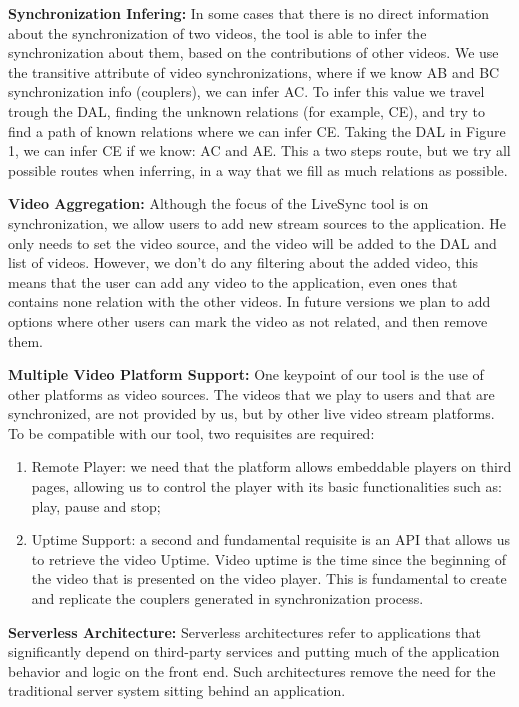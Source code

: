 \documentclass[sigconf]{acmart}
\begin{document}
\textbf{Synchronization Infering:} In some cases that there is no direct information about the synchronization of two videos, the tool is able to infer the synchronization about them, based on the contributions of other videos. We use the transitive attribute of video synchronizations, where if we know AB and BC synchronization info (couplers), we can infer AC. To infer this value we travel trough the DAL, finding the unknown relations (for example, CE), and try to find a path of known relations where we can infer CE. Taking the DAL in Figure 1, we can infer CE if we know: AC and AE. This a two steps route, but we try all possible routes when inferring, in a way that we fill as much relations as possible.

\textbf{Video Aggregation:} Although the focus of the LiveSync tool is on synchronization, we allow users to add new stream sources to the application. He only needs to set the video source, and the video will be added to the DAL and list of videos. However, we don't do any filtering about the added video, this means that the user can add any video to the application, even ones that contains none relation with the other videos. In future versions we plan to add options where other users can mark the video as not related, and then remove them.

\textbf{Multiple Video Platform Support:} One keypoint of our tool is the use of other platforms as video sources. The videos that we play to users and that are synchronized, are not provided by us, but by other live video stream platforms. To be compatible with our tool, two requisites are required:

\begin{enumerate}
	\item Remote Player: we need that the platform allows embeddable players on third pages, allowing us to control the player with its basic functionalities such as: play, pause and stop;
	\item Uptime Support: a second and fundamental requisite is an API that allows us to retrieve the video Uptime. Video uptime is the time since the beginning of the video that is presented on the video player. This is fundamental to create and replicate the couplers generated in synchronization process.
\end{enumerate}

\textbf{Serverless Architecture:} Serverless architectures refer to applications that significantly depend on third-party services and putting much of the application behavior and logic on the front end. Such architectures remove the need for the traditional server system sitting behind an application.
\end{document}
